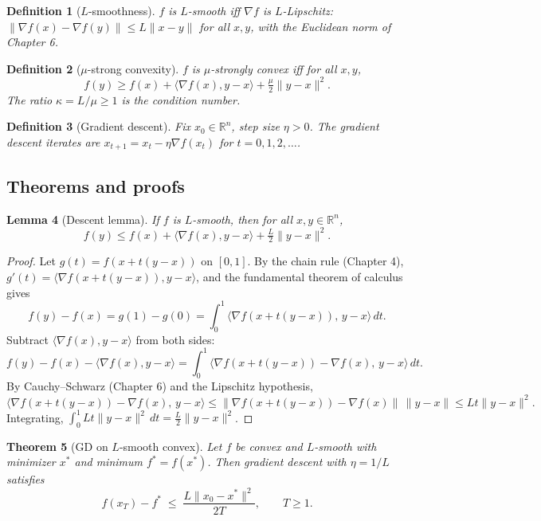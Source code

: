 \documentclass[11pt]{article}
\newtheorem{theorem}{Theorem}[section]
\newtheorem{definition}[theorem]{Definition}
\newtheorem{lemma}[theorem]{Lemma}
\theoremstyle{remark}
\begin{document}
\begin{definition}[$L$-smoothness]
$f$ is \emph{$L$-smooth} iff $\nabla f$ is $L$-Lipschitz: $\|\nabla f(x) - \nabla f(y)\| \leq L \|x - y\|$ for all $x, y$, with the Euclidean norm of Chapter 6.
\end{definition}

\begin{definition}[$\mu$-strong convexity]
$f$ is \emph{$\mu$-strongly convex} iff for all $x, y$,
\[
f(y) \geq f(x) + \langle \nabla f(x), y - x \rangle + \tfrac{\mu}{2} \|y - x\|^2.
\]
The ratio $\kappa = L / \mu \geq 1$ is the \emph{condition number}.
\end{definition}

\begin{definition}[Gradient descent]
Fix $x_0 \in \mathbb{R}^n$, step size $\eta > 0$. The \emph{gradient descent} iterates are $x_{t+1} = x_t - \eta \nabla f(x_t)$ for $t = 0, 1, 2, \ldots$.
\end{definition}

\subsection*{Theorems and proofs}

\begin{lemma}[Descent lemma]
If $f$ is $L$-smooth, then for all $x, y \in \mathbb{R}^n$,
\[
f(y) \leq f(x) + \langle \nabla f(x), y - x \rangle + \tfrac{L}{2}\|y - x\|^2.
\]
\end{lemma}

\begin{proof}
Let $g(t) = f(x + t(y - x))$ on $[0,1]$. By the chain rule (Chapter 4), $g'(t) = \langle \nabla f(x + t(y-x)), y - x\rangle$, and the fundamental theorem of calculus gives
\[
f(y) - f(x) = g(1) - g(0) = \int_0^1 \langle \nabla f(x + t(y-x)),\, y - x \rangle \, dt.
\]
Subtract $\langle \nabla f(x), y - x \rangle$ from both sides:
\[
f(y) - f(x) - \langle \nabla f(x), y - x \rangle = \int_0^1 \langle \nabla f(x + t(y-x)) - \nabla f(x),\, y - x \rangle \, dt.
\]
By Cauchy--Schwarz (Chapter 6) and the Lipschitz hypothesis,
\[
\langle \nabla f(x + t(y-x)) - \nabla f(x),\, y - x \rangle \leq \|\nabla f(x + t(y-x)) - \nabla f(x)\|\,\|y - x\| \leq L t \|y - x\|^2.
\]
Integrating, $\int_0^1 L t \|y - x\|^2 \, dt = \tfrac{L}{2}\|y - x\|^2$.
\end{proof}

\begin{theorem}[GD on $L$-smooth convex]
Let $f$ be convex and $L$-smooth with minimizer $x^*$ and minimum $f^* = f(x^*)$. Then gradient descent with $\eta = 1/L$ satisfies
\[
f(x_T) - f^* \;\leq\; \frac{L \|x_0 - x^*\|^2}{2T}, \qquad T \geq 1.
\]
\end{theorem}
\end{document}
